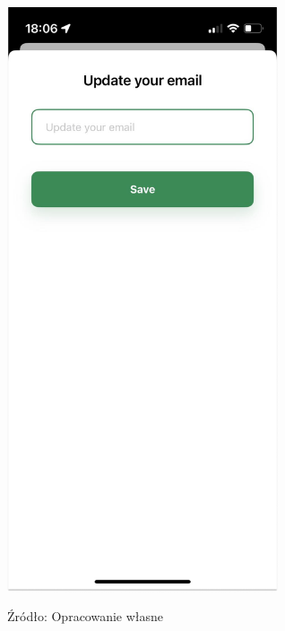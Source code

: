\documentclass[12pt, a4paper, twoside, openany]{book}
\newlength\imgth
\begin{document}
\begin{figure}[h]
    \centering
    \includegraphics[width=8cm, height={\imgth}, keepaspectratio]{./static/mobile/update-email.jpg}\\
    \raggedright\scriptsize{Źródło: Opracowanie własne}
\end{figure}
\end{document}
